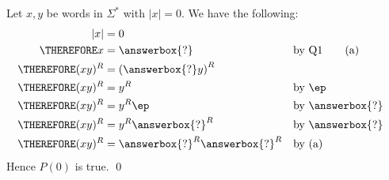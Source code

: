         Let $x, y$ be words in $\Sigma^*$ with $|x| = 0$.
We have the following:
\begin{align*}
              |x| &= 0                                                 \\
\THEREFORE      x &= \answerbox{?}        & & \text{by Q1} \tag{a}     \\
\THEREFORE (xy)^R &= \left( \answerbox{?} y \right)^R  & &                          \\
\THEREFORE (xy)^R &= y^R                  & & \text{by $\ep$}  \\
\THEREFORE (xy)^R &= y^R \ep              & & \text{by \answerbox{?}}  \\
\THEREFORE (xy)^R &= y^R \answerbox{?}^R  & & \text{by \answerbox{?}}  \\
\THEREFORE (xy)^R &= \answerbox{?}^R \answerbox{?}^R & & \text{by (a)} 
\end{align*}
Hence $P(0)$ is true.
\qed
\\

